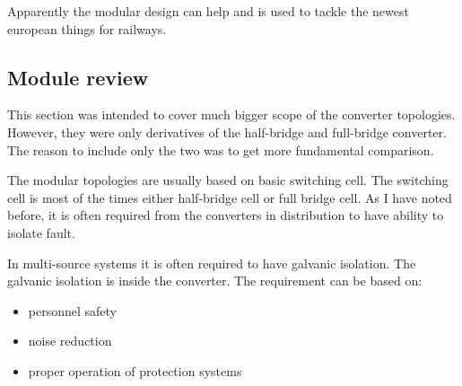 \documentclass[]{scrartcl}
\newenvironment{remark}[1][Remark]{\begin{trivlist}
		\item[\hskip \labelsep {\bfseries #1}]}{\end{trivlist}}
\begin{document}
Apparently the modular design can help and is used to tackle the newest european things for railways.

\subsection{Module  review}
\begin{remark}
	This section was intended to cover much bigger scope of the converter topologies. However, they were only derivatives of the half-bridge and full-bridge converter. The reason to include only the two was to get more fundamental comparison. 
\end{remark}

The modular topologies are usually based on basic switching cell. The switching cell is most of the times either half-bridge cell or full bridge cell. As I have noted before, it is often required from the converters in distribution to have ability to isolate fault. 

In multi-source systems it is often required to have galvanic isolation. The galvanic isolation is inside the converter. The requirement can be based on\cite{Karshenas2011}: 
\begin{itemize}
	\item personnel safety 
	\item noise reduction
	\item proper operation of protection systems
\end{itemize}
\end{document}
